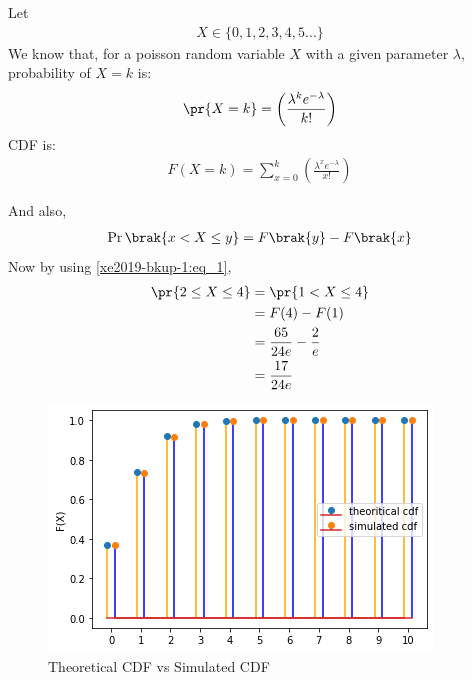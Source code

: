 
Let 
\begin{align}
	X\in \{0,1,2,3,4,5...\}
\end{align}
We know that, for a poisson random variable $X$ with a given parameter $\lambda$, probability of $X=k$ is:
\begin{align} \label{xe2019-bkup-1:eq_0}
	\pr{X=k}=\left(\frac{\lambda^k e^{-\lambda}}{k!}\right)	
\end{align}
CDF is:
\begin{align}
    F(X=k)=\sum_{x=0}^{k}\left(\frac{\lambda^x e^{-\lambda}}{x!}\right)
\end{align}
   
And also,
\begin{align}
    \Pr\brak{x < X \le y} = F\brak{y} - F\brak{x}\label{xe2019-bkup-1:eq_1}
\end{align}
Now by using \eqref{xe2019-bkup-1:eq_1},
\begin{align}
    \pr{2 \leq X \leq 4} 
    & = \pr{1 < X \leq 4}\\
    & = F(4)-F(1)\\
    & = \frac{65}{24e}-\frac{2}{e}\\
    & = \frac{17}{24e}
\end{align}
\begin{figure}[ht]
    \centering
    \includegraphics[width=\columnwidth]{solutions/xe/2019/simulated_theoritical.png}
    \caption{Theoretical CDF vs Simulated CDF}
    \label{xe2019-bkup-1:Figure_0}
\end{figure}